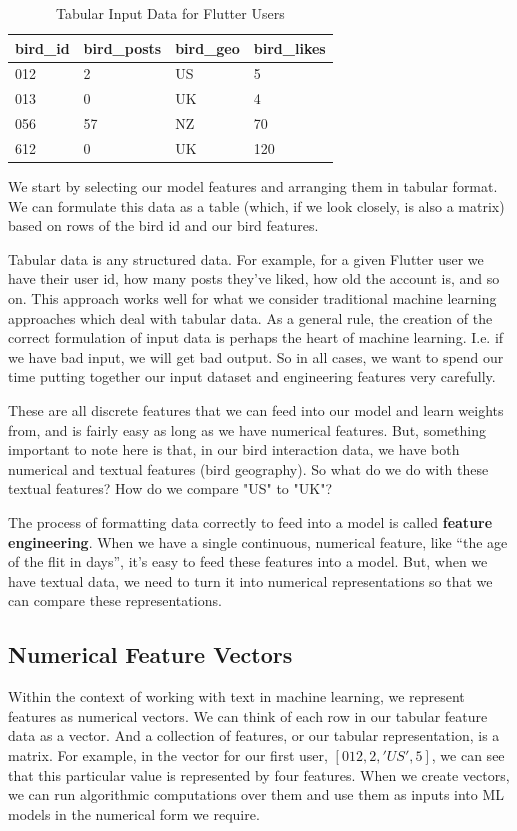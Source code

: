 \documentclass[11pt, table]{diazessay} %
\begin{document}
\begin{sloppypar}
\begin{table}[H]
  \centering
	\caption{Tabular Input Data for Flutter Users}
\begin{tabular}{|l|l|l|l|}
\hline
\rowcolor[HTML]{D5E7F7}
bird\_id & bird\_posts & bird\_geo & bird\_likes \\ \hline
012  	& 2       	& US    	& 5       	\\ \hline
013  	& 0       	& UK    	& 4       	\\ \hline
056  	& 57      	& NZ    	& 70      	\\ \hline
612  	& 0       	& UK    	& 120     	\\ \hline
\end{tabular}
\end{table}

We start by selecting our model features and arranging them in tabular format.  We can formulate this data as a table (which, if we look closely, is also a matrix) based on rows of the bird id and our bird features.

Tabular data is any structured data. For example, for a given Flutter user we have their user id, how many posts they've liked, how old the account is, and so on. This approach works well for what we consider traditional machine learning approaches which deal with tabular data.  As a general rule, the creation of the correct formulation of input data is perhaps the heart of machine learning. I.e. if we have bad input, we will get bad output. So in all cases, we want to spend our time putting together our input dataset and engineering features very carefully.

These are all discrete features that we can feed into our model and learn weights from, and is fairly easy as long as we have numerical features.  But, something important to note here is that, in our bird interaction data, we have both numerical and textual features (bird geography). So what do we do with these textual features? How do we compare "US" to "UK"?

The process of formatting data correctly to feed into a model is called \textbf{feature engineering}. When we have a single continuous, numerical feature, like “the age of the flit in days”, it’s easy to feed these features into a model. But, when we have textual data, we need to turn it into numerical representations so that we can compare these representations.  

\subsection{Numerical Feature Vectors}
Within the context of working with text in machine learning, we represent features as numerical vectors. We can think of each row in our tabular feature data as a vector. And a collection of features, or our tabular representation, is a matrix. For example, in the vector for our first user, $[012, 2, 'US', 5]$, we can see that this particular value is represented by four features. When we create vectors, we can run algorithmic computations over them and use them as inputs into ML models in the numerical form we require.


\end{sloppypar}
\end{document}
